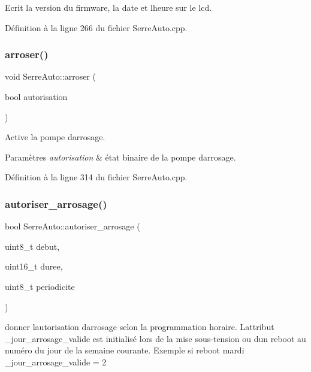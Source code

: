Ecrit la version du firmware, la date et l\textquotesingle{}heure sur le lcd. 



Définition à la ligne 266 du fichier Serre\+Auto.\+cpp.

\mbox{\label{class_serre_auto_a467d5419c23fcd68f4a1400c30083f0b}} 
\subsubsection{arroser()}
{\footnotesize\ttfamily void Serre\+Auto\+::arroser (\begin{DoxyParamCaption}\item[{bool}]{autorisation }\end{DoxyParamCaption})}



Active la pompe d\textquotesingle{}arrosage. 


\begin{DoxyParams}{Paramètres}
{\em autorisation} & état binaire de la pompe d\textquotesingle{}arrosage. \\
\hline
\end{DoxyParams}


Définition à la ligne 314 du fichier Serre\+Auto.\+cpp.

\mbox{\label{class_serre_auto_a9b7cef785d589b7fb34ffce43a144f2b}} 
\subsubsection{autoriser\+\_\+arrosage()}
{\footnotesize\ttfamily bool Serre\+Auto\+::autoriser\+\_\+arrosage (\begin{DoxyParamCaption}\item[{uint8\+\_\+t}]{debut,  }\item[{uint16\+\_\+t}]{duree,  }\item[{uint8\+\_\+t}]{periodicite }\end{DoxyParamCaption})}



donner l\textquotesingle{}autorisation d\textquotesingle{}arrosage selon la programmation horaire. L\textquotesingle{}attribut \+\_\+jour\+\_\+arrosage\+\_\+valide est initialisé lors de la mise sous-\/tension ou d\textquotesingle{}un reboot au numéro du jour de la semaine courante. Exemple si reboot mardi \+\_\+jour\+\_\+arrosage\+\_\+valide = 2 


